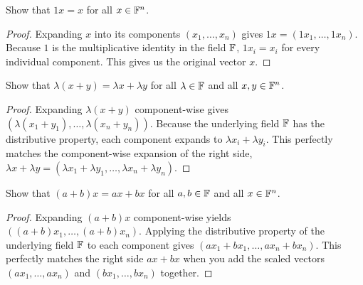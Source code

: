 \begin{question}
	Show that $1x = x$ for all $x \in \mathbb{F}^n$.  
\end{question}
\begin{proof}
	Expanding $x$ into its components $(x_1, \dots, x_n)$ gives $1x = (1x_1, \dots, 1x_n)$. Because $1$ is the multiplicative identity in the field $\mathbb{F}$, $1x_i = x_i$ for every individual component. This gives us the original vector $x$.
\end{proof}
\begin{question}
	Show that $\lambda(x + y) = \lambda x + \lambda y$ for all $\lambda \in \mathbb{F}$ and all $x, y \in \mathbb{F}^n$.   
\end{question}
\begin{proof}
	Expanding $\lambda(x + y)$ component-wise gives $(\lambda(x_1 + y_1), \dots, \lambda(x_n + y_n))$. Because the underlying field $\mathbb{F}$ has the distributive property, each component expands to $\lambda x_i + \lambda y_i$. This perfectly matches the component-wise expansion of the right side, $\lambda x + \lambda y = (\lambda x_1 + \lambda y_1, \dots, \lambda x_n + \lambda y_n)$.
\end{proof}
\begin{question}
	Show that $(a + b)x = ax + bx$ for all $a, b \in \mathbb{F}$ and all $x \in \mathbb{F}^n$.   
\end{question}
\begin{proof}
	Expanding $(a + b)x$ component-wise yields $((a + b)x_1, \dots, (a + b)x_n)$. Applying the distributive property of the underlying field $\mathbb{F}$ to each component gives $(ax_1 + bx_1, \dots, ax_n + bx_n)$. This perfectly matches the right side $ax + bx$ when you add the scaled vectors $(ax_1, \dots, ax_n)$ and $(bx_1, \dots, bx_n)$ together.
\end{proof}
